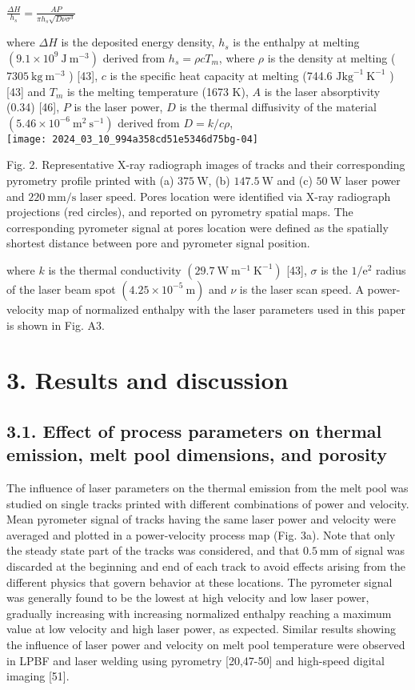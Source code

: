 \documentclass[10pt]{article}
\begin{document}
$\frac{\Delta H}{h_{s}}=\frac{A P}{\pi h_{s} \sqrt{D \nu \sigma^{3}}}$

where $\Delta H$ is the deposited energy density, $h_{s}$ is the enthalpy at melting $\left(9.1 \times 10^{9} \mathrm{~J} \mathrm{~m}^{-3}\right)$ derived from $h_{s}=\rho c T_{m}$, where $\rho$ is the density at melting ( $7305 \mathrm{~kg} \mathrm{~m}^{-3}$ ) [43], $c$ is the specific heat capacity at melting (744.6 $\mathrm{J} \mathrm{kg}^{-1} \mathrm{~K}^{-1}$ ) [43] and $T_{m}$ is the melting temperature (1673 K), $A$ is the laser absorptivity (0.34) [46], $P$ is the laser power, $D$ is the thermal diffusivity of the material $\left(5.46 \times 10^{-6} \mathrm{~m}^{2} \mathrm{~s}^{-1}\right)$ derived from $D=k / c \rho$,\\
\texttt{[image: 2024\_03\_10\_994a358cd51e5346d75bg-04]}

Fig. 2. Representative X-ray radiograph images of tracks and their corresponding pyrometry profile printed with (a) $375 \mathrm{~W}$, (b) $147.5 \mathrm{~W}$ and (c) $50 \mathrm{~W}$ laser power and $220 \mathrm{~mm} / \mathrm{s}$ laser speed. Pores location were identified via X-ray radiograph projections (red circles), and reported on pyrometry spatial maps. The corresponding pyrometer signal at pores location were defined as the spatially shortest distance between pore and pyrometer signal position.

where $k$ is the thermal conductivity $\left(29.7 \mathrm{~W} \mathrm{~m}^{-1} \mathrm{~K}^{-1}\right)$ [43], $\sigma$ is the $1 / \mathrm{e}^{2}$ radius of the laser beam spot $\left(4.25 \times 10^{-5} \mathrm{~m}\right)$ and $\nu$ is the laser scan speed. A power-velocity map of normalized enthalpy with the laser parameters used in this paper is shown in Fig. A3.

\section*{3. Results and discussion}
\subsection*{3.1. Effect of process parameters on thermal emission, melt pool dimensions, and porosity}
The influence of laser parameters on the thermal emission from the melt pool was studied on single tracks printed with different combinations of power and velocity. Mean pyrometer signal of tracks having the same laser power and velocity were averaged and plotted in a power-velocity process map (Fig. 3a). Note that only the steady state part of the tracks was considered, and that $0.5 \mathrm{~mm}$ of signal was discarded at the beginning and end of each track to avoid effects arising from the different physics that govern behavior at these locations. The pyrometer signal was generally found to be the lowest at high velocity and low laser power, gradually increasing with increasing normalized enthalpy reaching a maximum value at low velocity and high laser power, as expected. Similar results showing the influence of laser power and velocity on melt pool temperature were observed in LPBF and laser welding using pyrometry [20,47-50] and high-speed digital imaging [51].
\end{document}
